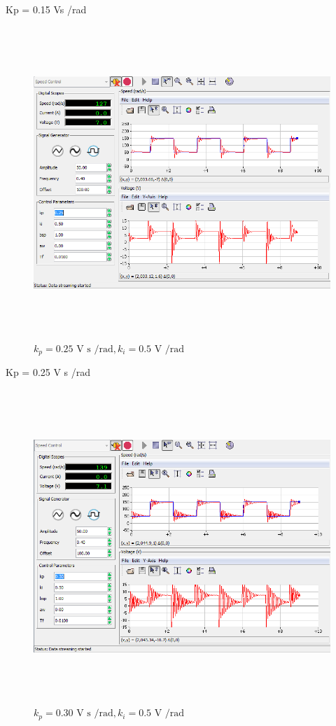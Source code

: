 \documentclass[]{article}
\begin{document}
Kp = 0.15 Vs /rad

\begin{figure}\includegraphics[width=6.50000in,height=4.63889in]{media/image18.png} \caption{$k_p = \text{0.25 V s /rad}, k_i = \text{0.5 V /rad}$} \end{figure}

Kp = 0.25 V s /rad

\begin{figure}\includegraphics[width=6.50000in,height=4.66667in]{media/image32.png} \caption{$k_p = \text{0.30 V s /rad}, k_i = \text{0.5 V /rad}$} \end{figure}
\end{document}

